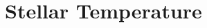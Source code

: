 \hypertarget{group___e_g_x_phys-_stellar_temperature}{}\section{Stellar Temperature}
\label{group___e_g_x_phys-_stellar_temperature}
